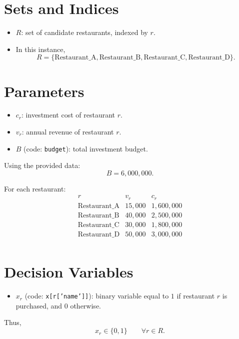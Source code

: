 \section*{Sets and Indices}

\begin{itemize}
    \item $R$: set of candidate restaurants, indexed by $r$.
    \item In this instance,
    \[
    R=\{\text{Restaurant\_A},\text{Restaurant\_B},\text{Restaurant\_C},\text{Restaurant\_D}\}.
    \]
\end{itemize}

\section*{Parameters}

\begin{itemize}
    \item $c_r$: investment cost of restaurant $r$.
    \item $v_r$: annual revenue of restaurant $r$.
    \item $B$ (code: \texttt{budget}): total investment budget.
\end{itemize}

Using the provided data:
\[
B = 6{,}000{,}000.
\]

For each restaurant:
\[
\begin{array}{c|cc}
r & v_r & c_r \\
\hline
\text{Restaurant\_A} & 15{,}000 & 1{,}600{,}000 \\
\text{Restaurant\_B} & 40{,}000 & 2{,}500{,}000 \\
\text{Restaurant\_C} & 30{,}000 & 1{,}800{,}000 \\
\text{Restaurant\_D} & 50{,}000 & 3{,}000{,}000 \\
\end{array}
\]

\section*{Decision Variables}

\begin{itemize}
    \item $x_r$ (code: \texttt{x[r['name']]}): binary variable equal to $1$ if restaurant $r$ is purchased, and $0$ otherwise.
\end{itemize}

Thus,
\[
x_r \in \{0,1\} \qquad \forall r \in R.
\]

